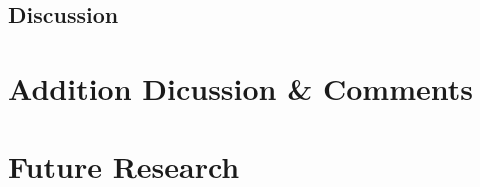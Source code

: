 \documentclass{article}
\begin{document}
\subsection{Discussion}
\newpage
\section{Addition Dicussion \& Comments}
\section{Future Research}
\newpage


%
\end{document}
